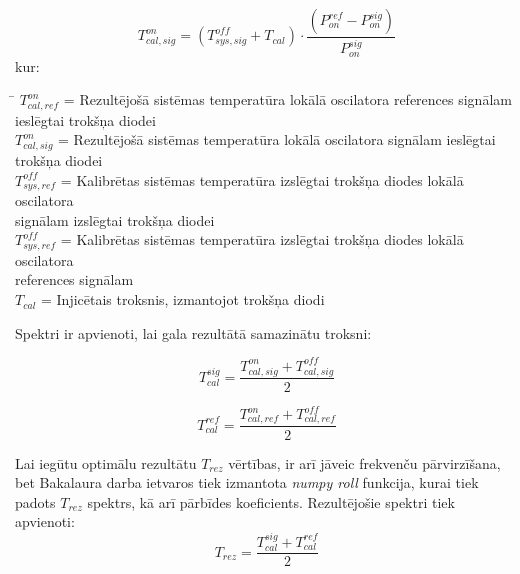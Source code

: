 \begin{equation}
T_{cal, sig}^{on} = \left( T_{sys,sig}^{off} + T_{cal} \right) \cdot \frac{\left( P_{on}^{ref} -  P_{on}^{sig}\right)}{ P_{on}^{sig}}\tag{1.2.7}\label{eq:1.2.7}  
\end{equation}
kur:
\begin{tabbing}
\phantom{\hspace{20mm}}\= \kill
$T_{cal,ref}^{on}$\>  = Rezultējošā sistēmas temperatūra lokālā oscilatora references signālam\\ ieslēgtai trokšņa diodei\\
$T_{cal,sig}^{on}$\>  = Rezultējošā sistēmas temperatūra lokālā oscilatora signālam ieslēgtai \\ trokšņa diodei\\
$T_{sys,ref}^{off}$\>  = Kalibrētas sistēmas temperatūra izslēgtai trokšņa diodes lokālā oscilatora \\ signālam izslēgtai trokšņa diodei\\
$T_{sys,ref}^{off}$\>  = Kalibrētas sistēmas temperatūra izslēgtai trokšņa diodes lokālā oscilatora \\references signālam \\
$T_{cal}$\>  = Injicētais troksnis, izmantojot trokšņa diodi\\


\end{tabbing}


Spektri ir apvienoti, lai gala rezultātā samazinātu troksni:

\begin{equation}
T_{cal}^{sig} = \frac{T_{cal, sig}^{on} + T_{cal, sig}^{off}}{2} \tag{1.2.8}\label{eq:1.2.8} 
\end{equation}

\begin{equation}
T_{cal}^{ref} = \frac{T_{cal, ref}^{on} + T_{cal, ref}^{off}}{2}\tag{1.2.9}\label{eq:1.2.9} 
\end{equation}


Lai iegūtu optimālu rezultātu $T_{rez}$ vērtības, ir arī jāveic frekvenču pārvirzīšana, bet Bakalaura darba ietvaros tiek izmantota \textit{ numpy roll } funkcija, kurai tiek padots $T_{rez}$ spektrs, kā arī pārbīdes koeficients. Rezultējošie spektri tiek apvienoti:
\begin{equation}
T_{rez} = \frac{T_{cal}^{sig} + T_{cal}^{ref}}{2}\tag{1.2.10}\label{eq:1.2.10} 
\end{equation}


